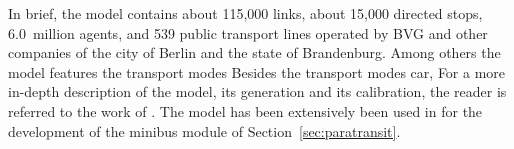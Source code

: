 In
brief, the model contains about 115,000 links, %
about 15,000 directed stops, %
6.0~million agents, %
and 539 public transport lines operated by BVG and other companies of the city
of Berlin and the state of Brandenburg. Among others the model features the transport modes Besides the transport modes car, For a more in-depth description of the
model, its generation and its calibration, the reader is referred to the work of
\cite{NeumannEtAl2014IatbrPtBerlinBook}. The model has been extensively been used in \citet[][Ch 7/8]{Neumann2014PhD} for the development of the minibus module of Section~\ref{sec:paratransit}.

%

